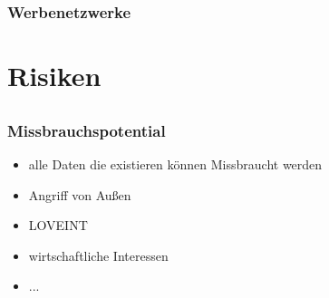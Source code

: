 \documentclass[12pt]{beamer}
\begin{document}
\begin{frame}
  \frametitle{Werbenetzwerke}
  \begin{center}
  \end{center}
\end{frame}

\section{Risiken}
\subsection{}

\begin{frame}
  \frametitle{Missbrauchspotential}
  \begin{itemize}
    \item<2-> alle Daten die existieren können Missbraucht werden
    \item<3-> Angriff von Außen
    \item<4-> LOVEINT
    \item<5-> wirtschaftliche Interessen
    \item<6-> ...
  \end{itemize}
\end{frame}
\end{document}
